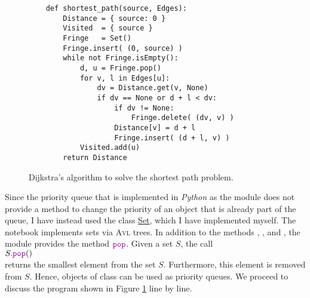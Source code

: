 \begin{figure}[!ht]
\centering
\begin{verbatim}
    def shortest_path(source, Edges):
        Distance = { source: 0 }
        Visited  = { source }
        Fringe   = Set()
        Fringe.insert( (0, source) )
        while not Fringe.isEmpty():
            d, u = Fringe.pop()
            for v, l in Edges[u]:
                dv = Distance.get(v, None)
                if dv == None or d + l < dv:
                    if dv != None:
                        Fringe.delete( (dv, v) )
                    Distance[v] = d + l
                    Fringe.insert( (d + l, v) )
            Visited.add(u)
        return Distance
\end{verbatim}
\vspace*{-0.3cm}
\caption{Dijkstra's algorithm to solve the shortest path problem.}
\label{fig:Dijkstra.ipynb}
\end{figure}
Since the priority queue that is implemented in \textsl{Python} as the module  does not provide a
method to change the priority of an object that is already part of the queue, I have instead used the class
\href{https://github.com/karlstroetmann/Algorithms/blob/master/Python/Set.ipynb}{Set}, which I have implemented
myself.  The notebook  implements sets via \textsc{Avl} trees.  In addition to the methods
, , and , the module  provides the method
$\mytt{pop}$.  Given a set $S$, the call
\\[0.2cm]
\hspace*{1.3cm}
$S.\mytt{pop}()$
\\[0.2cm]
returns the smallest element from the set $S$.  Furthermore, this element is removed from $S$.
Hence, objects of class  can be used as priority queues.
We proceed to discuss the program shown in Figure \ref{fig:Dijkstra.ipynb} line by line.
